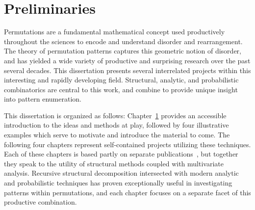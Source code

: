 \documentclass[12pt,twoside]{memoir}
\newcommand{\UnderlinedTocSection}[1]{%
  \addtocontents{toc}{\protect\addvspace{1pc}%
         \protect\contentsline {chapter}%
        {\protect\Large\scshape\mdseries #1}{}{}%
        \hfill\par\protect\addvspace{-18pt}%
        \noindent\hrulefill\hspace*{24pc}\par}}
\begin{document}


\UnderlinedTocSection{Chapters}

\mainmatter

\cleardoublepage
\typeout{******************}
\typeout{******************}

  \chapter{Preliminaries}
  \label{chap:prelim}



    Permutations are a fundamental mathematical concept used productively
    throughout the sciences to encode and understand disorder and rearrangement. 
    The theory of permutation patterns captures this geometric notion of
    disorder, and has yielded a wide variety of productive and surprising
    research over the past several decades. This dissertation presents several
    interrelated projects within this interesting and rapidly developing field.
    Structural, analytic, and probabilistic combinatorics are central to this
    work, and combine to provide unique insight into pattern enumeration. 

    This dissertation is organized as follows: Chapter~\ref{chap:prelim} provides
    an accessible introduction to the ideas and methods at play, followed by four 
    illustrative examples which serve to motivate and introduce the material
    to come. The following four chapters represent self-contained projects
    utilizing these techniques.  Each of these chapters is based partly on
    separate publications~\cite{me-expat,me-polyclass,me-fixpat,me-involutions},
    but together they speak to the utility of structural methods coupled with
    multivariate analysis.  Recursive structural decomposition intersected with
    modern analytic and probabilistic techniques has proven exceptionally useful
    in investigating patterns within permutations, and each chapter focuses on a
    separate facet of this productive combination. 
    
\end{document}

